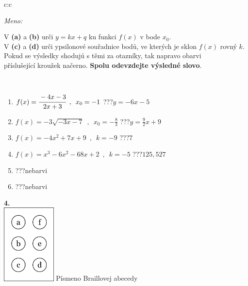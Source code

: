 \documentclass[10pt]{report}
\begin{document}
\begin{tabular}{c:c}
\begin{minipage}[c][104.5mm][t]{0.5\linewidth}
\begin{center}
\textit{Meno:}\phantom{xxxxxxxxxxxxxxxxxxxxxxxxxxxxxxxxxxxxxxxxxxxxxxxxxxxxxxxxxxxxxxxxx}\\[5mm]
\begin{minipage}{0.95\linewidth}
\begin{center}
V \textbf{(a)} a \textbf{(b)} urči  $y = kx + q$ ku funkci $f(x)$ v bode $x_0$.\\V \textbf{(c)} a \textbf{(d)} urči ypsilonové souřadnice bodů, ve kterých je sklon $f(x)$ rovný $k$.\\Pokud se výsledky shodujú s těmi za otazníky, tak napravo obarvi\\příslušející kroužek načerno. \textbf{Spolu odevzdejte výsledné slovo}.
\end{center}
\end{minipage}
\\[1mm]
\begin{minipage}{0.79\linewidth}
\begin{center}
\begin{varwidth}{\linewidth}
\begin{enumerate}
\small
\item $f(x)=\cfrac{-4x-3}{2x+3}\enspace , \enspace x_0=-1$\quad \dotfill\; ???\;\dotfill \quad $y = -6x-5$
\item $f(x)=-3\sqrt{-3x-7}\enspace , \enspace x_0=-\frac{8}{3}$\quad \dotfill\; ???\;\dotfill \quad $y = \frac{9}{2}x+9$
\item $f(x)=-4x^2+7x+9\enspace , \enspace k=-9$\quad \dotfill\; ???\;\dotfill \quad $7$
\item $f(x)=x^3-6x^2-68x+2\enspace , \enspace k=-5$\quad \dotfill\; ???\;\dotfill \quad $125 , 527$
\item \quad \dotfill\; ???\;\dotfill \quad nebarvi
\item \quad \dotfill\; ???\;\dotfill \quad nebarvi
\end{enumerate}
\end{varwidth}
\end{center}
\end{minipage}
\begin{minipage}{0.20\linewidth}
\begin{center}
{\Huge\bfseries 4.} \\[2mm]
\includegraphics[height=40mm]{../images/braille.png}
{\small Písmeno Braillovej abecedy}
\end{center}
\end{minipage}
\end{center}
\end{minipage}
%
\end{tabular}
\end{document}
